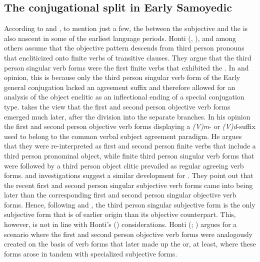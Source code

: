 \documentclass[output=paper]{LSP/langsci}
\begin{document}
\subsection{The conjugational split in Early Samoyedic}\label{12-wr-sec:2-2}

According to \citet{Gulya1995Transitivitat,Honti1995Morphotaktik,Honti2009Tunodesek,Abondolo1998Uralic,Havas2004Objective,Kortvely2005Verb,Kunnap2008Person} and \citet{Kiss2010Magyar}, 
to mention just a few, the  between the subjective and the  is also nascent in some of the earliest  language periods. Honti (\citeyear[59]{Honti1995Morphotaktik}, \citeyear[136--143]{Honti2009Tunodesek}), \citet[119--138]{Havas2004Objective} and \citet[70--88]{Kortvely2005Verb} among others assume that the objective pattern descends from  third person pronouns that encliticized onto finite verbs of transitive clauses. They argue that the  third person singular verb forms were the first finite verbs that exhibited the . In  and  opinion, this is because only the third person singular verb form of the Early  general conjugation lacked an agreement suffix and therefore allowed for an analysis of the object enclitic as an inflectional ending of a special conjugation type. \citet{Havas2004Objective} takes the view that the first and second person objective verb forms emerged much later, after the division into the separate  branches. In his opinion the  first and second person objective verb forms displaying a \textit{(V)m}- or \textit{(V)d}-suffix used to belong to the common  verbal subject agreement paradigm. 
He argues that they were re-interpreted as first and second person finite verbs that include a  third person pronominal object, while finite third person singular verb forms that were followed by a third person object clitic prevailed as regular agreeing verb forms.  and  investigations suggest a similar development for . They point out that the recent  first and second person singular subjective verb forms  came into being  later than the corresponding first and second person singular objective verb forms. 
Hence, following \citet{Havas2004Objective} and \citet{Kortvely2005Verb}, the  third person singular subjective form is the only subjective form that is of earlier origin than its objective counterpart. This, however, is not in line with Honti’s (\citeyear{Honti1995Morphotaktik,Honti2009Tunodesek}) considerations. Honti (\citeyear{Honti1995Morphotaktik}; \citeyear{Honti2009Tunodesek}) argues for a scenario where the  first and second person objective verb forms were analogously created on the basis of verb forms that later made up the  or, at least, where these forms arose in tandem with specialized subjective forms. 
\end{document}
